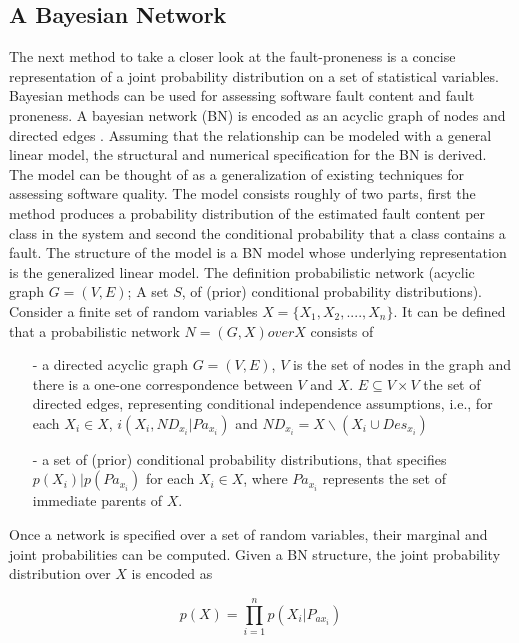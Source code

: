 \subsection{A Bayesian Network}

The next method to take a closer look at the fault-proneness is a concise representation of a joint probability distribution on a set of statistical variables. Bayesian methods can be used for assessing software fault content and fault proneness. A bayesian network (BN) is encoded as an acyclic graph of nodes and directed edges \cite{b9pai2007empirical}. Assuming that the relationship can be modeled with a general linear model, the structural and numerical specification for the BN is derived. The model can be thought of as a generalization of existing techniques for assessing software quality. The model consists roughly of two parts, first the method produces a probability distribution of the estimated fault content per class in the system and second the conditional probability that a class contains a fault. 
The structure of the model is a BN model whose underlying representation is the generalized linear model. The definition probabilistic network (acyclic graph $G=(V,E)$; A set $S$, of (prior) conditional probability distributions).
Consider a finite set of random variables $X=\{X_1,X_2,....,X_n\}$. It can be defined that a probabilistic network $N=(G,X) over X$ consists of
 \begin{enumerate}
 	\item[-] a directed acyclic graph $G=(V,E)$, $V$ is the set of nodes in the graph and there is a one-one correspondence between $V$ and $X$. $E \subseteq V \times V$ the set of directed edges, representing conditional independence assumptions, i.e., for each $X_i \in X$, $i(X_i,N D_{x_i}| Pa_{x_i})$ and $N D_{x_i} = X \backslash ({X_i} \cup Des_{x_i})$ 
 	\item[-] a set of (prior) conditional probability distributions, that specifies $p(X_i)| p(Pa_{x_i})$ for each $X_i \in X$, where $Pa_{x_i}$ represents the set of immediate parents of $X$.
 \end{enumerate} 

Once a network is specified over a set of random variables, their marginal and joint probabilities can be computed.
Given a BN structure, the joint probability distribution over $X$ is encoded as

\begin{displaymath}
	p(X)= \prod_{i=1}^{n}p(X_i|P_{ax_i})
\end{displaymath}

